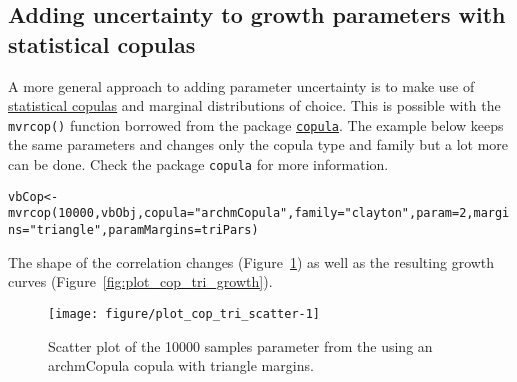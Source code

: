 \documentclass[a4paper,english,10pt]{article}\usepackage[]{graphicx}\usepackage[]{color}
\makeatletter
\def\maxwidth{ %
  \ifdim\Gin@nat@width>\linewidth
    \linewidth
  \else
    \Gin@nat@width
  \fi
}
\newcommand{\hlnum}[1]{\textcolor[rgb]{0.2,0.2,0.2}{#1}}%
\newcommand{\hlstr}[1]{\textcolor[rgb]{0.2,0.2,0.2}{#1}}%
\newcommand{\hlstd}[1]{\textcolor[rgb]{0,0,0}{#1}}%
\newcommand{\hlkwb}[1]{\textcolor[rgb]{0.361,0.506,0.596}{#1}}%
\newcommand{\hlkwc}[1]{\textcolor[rgb]{0.361,0.506,0.596}{#1}}%
\newcommand{\hlkwd}[1]{\textcolor[rgb]{0.361,0.506,0.596}{#1}}%
\newenvironment{kframe}{%
 \def\at@end@of@kframe{}%
 \ifinner\ifhmode%
  \def\at@end@of@kframe{\end{minipage}}%
  \begin{minipage}{\columnwidth}%
 \fi\fi%
 \def\FrameCommand##1{\hskip\@totalleftmargin \hskip-\fboxsep
 \colorbox{shadecolor}{##1}\hskip-\fboxsep
     \hskip-\linewidth \hskip-\@totalleftmargin \hskip\columnwidth}%
 \MakeFramed {\advance\hsize-\width
   \@totalleftmargin\z@ \linewidth\hsize
   \@setminipage}}%
 {\par\unskip\endMakeFramed%
 \at@end@of@kframe}
\newenvironment{knitrout}{}{} %
\newcommand{\code}[1]{{\texttt{#1}}}
\newcommand{\pkg}[1]{{\texttt{#1}}}
\makeatother
\begin{document}
\subsection{Adding uncertainty to growth parameters with statistical copulas}

A more general approach to adding parameter uncertainty is to make use of \href{http://www.encyclopediaofmath.org/index.php/Copula}{statistical copulas} and marginal distributions of choice. This is possible with the \code{mvrcop()} function borrowed from the package \href{http://cran.r-project.org/web/packages/copula/}{\pkg{copula}}. The example below keeps the same parameters and changes only the copula type and family but a lot more can be done. Check the package \pkg{copula} for more information. 


\begin{knitrout}
\color{fgcolor}\begin{kframe}
\begin{alltt}
\hlstd{vbCop} \hlkwb{<-} \hlkwd{mvrcop}\hlstd{(}\hlnum{10000}\hlstd{, vbObj,} \hlkwc{copula}\hlstd{=}\hlstr{"archmCopula"}\hlstd{,} \hlkwc{family}\hlstd{=}\hlstr{"clayton"}\hlstd{,} \hlkwc{param}\hlstd{=}\hlnum{2}\hlstd{,} \hlkwc{margins}\hlstd{=}\hlstr{"triangle"}\hlstd{,} \hlkwc{paramMargins}\hlstd{=triPars)}
\end{alltt}
\end{kframe}
\end{knitrout}

The shape of the correlation changes (Figure~\ref{fig:plot_cop_tri_scatter}) as well as the resulting growth curves (Figure~\ref{fig:plot_cop_tri_growth}). 

\begin{knitrout}
\color{fgcolor}\begin{figure}[H]

{\centering \texttt{[image: figure/plot\_cop\_tri\_scatter-1]} 

}

\caption[Scatter plot of the 10000 samples parameter from the using an archmCopula copula with triangle margins]{Scatter plot of the 10000 samples parameter from the using an archmCopula copula with triangle margins.\label{fig:plot_cop_tri_scatter}}
\end{figure}


\end{knitrout}
\end{document}
